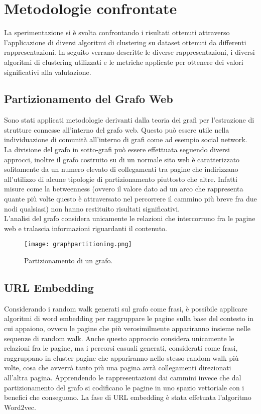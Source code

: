 \section{Metodologie confrontate}
La sperimentazione si è svolta confrontando i risultati ottenuti attraverso l'applicazione di diversi algoritmi di clustering su dataset ottenuti da differenti rappresentazioni. In seguito verrano descritte le diverse rappresentazioni, i diversi algoritmi di clustering utilizzati e le metriche applicate per ottenere dei valori significativi alla valutazione.
\subsection{Partizionamento del Grafo Web}
Sono stati applicati metodologie derivanti dalla teoria dei grafi per l'estrazione di strutture connesse all'interno del grafo web. Questo può essere utile nella individuazione di comunità all'interno di grafi come ad esempio social network. La divisione del grafo in sotto-grafi può essere effettuata seguendo diversi approcci, inoltre il grafo costruito su di un normale sito web è caratterizzato solitamente da un numero elevato di collegamenti tra pagine che indirizzano all'utilizzo di alcune tipologie di partizionamento piuttosto che altre. Infatti misure come la betweenness (ovvero il valore dato ad un arco che rappresenta quante più volte questo è attraversato nel percorrere il cammino più breve fra due nodi qualsiasi) non hanno restituito risultati significativi.
\\
L'analisi del grafo considera unicamente le relazioni che intercorrono fra le pagine web e tralascia informazioni riguardanti il contenuto.
\begin{figure}[htb]
	\centering
	\texttt{[image: graphpartitioning.png]}
	\caption{Partizionamento di un grafo.}
	\label{modularity}
\end{figure}

\subsection{URL Embedding}
Considerando i random walk generati sul grafo come frasi, è possibile applicare algoritmi di word embedding per raggruppare le pagine sulla base del contesto in cui appaiono, ovvero le pagine che più verosimilmente appariranno insieme nelle sequenze di random walk. Anche questo approccio considera unicamente le relazioni fra le pagine, ma i percorsi casuali generati, considerati come frasi, raggruppano in cluster pagine che appariranno nello stesso random walk più volte, cosa che avverrà tanto più una pagina avrà collegamenti direzionati all'altra pagina. Apprendendo le rappresentazioni dai cammini invece che dal partizionamento del grafo si codificano le pagine in uno spazio vettoriale con i benefici che conseguono. La fase di URL embedding è stata effetuata l'algoritmo Word2vec.

